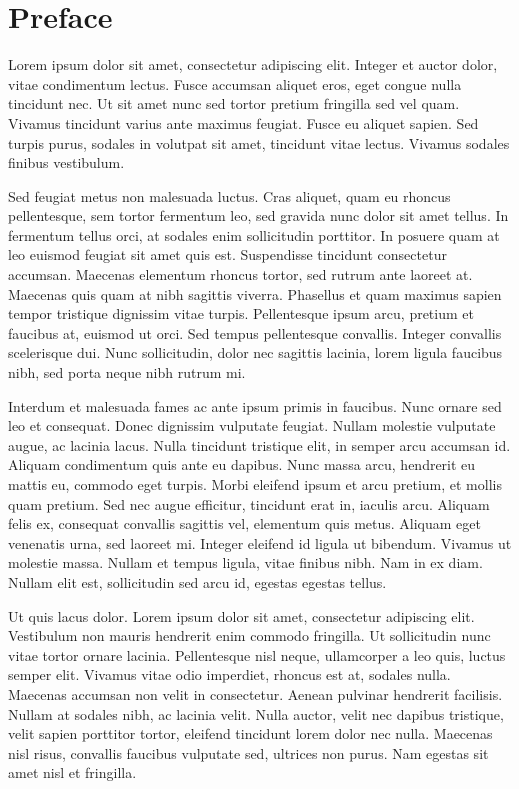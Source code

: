 \chapter*{Preface}

Lorem ipsum dolor sit amet, consectetur adipiscing elit. Integer et auctor dolor, vitae condimentum lectus. Fusce accumsan aliquet eros, eget congue nulla tincidunt nec. Ut sit amet nunc sed tortor pretium fringilla sed vel quam. Vivamus tincidunt varius ante maximus feugiat. Fusce eu aliquet sapien. Sed turpis purus, sodales in volutpat sit amet, tincidunt vitae lectus. Vivamus sodales finibus vestibulum.

Sed feugiat metus non malesuada luctus. Cras aliquet, quam eu rhoncus pellentesque, sem tortor fermentum leo, sed gravida nunc dolor sit amet tellus. In fermentum tellus orci, at sodales enim sollicitudin porttitor. In posuere quam at leo euismod feugiat sit amet quis est. Suspendisse tincidunt consectetur accumsan. Maecenas elementum rhoncus tortor, sed rutrum ante laoreet at. Maecenas quis quam at nibh sagittis viverra. Phasellus et quam maximus sapien tempor tristique dignissim vitae turpis. Pellentesque ipsum arcu, pretium et faucibus at, euismod ut orci. Sed tempus pellentesque convallis. Integer convallis scelerisque dui. Nunc sollicitudin, dolor nec sagittis lacinia, lorem ligula faucibus nibh, sed porta neque nibh rutrum mi.

Interdum et malesuada fames ac ante ipsum primis in faucibus. Nunc ornare sed leo et consequat. Donec dignissim vulputate feugiat. Nullam molestie vulputate augue, ac lacinia lacus. Nulla tincidunt tristique elit, in semper arcu accumsan id. Aliquam condimentum quis ante eu dapibus. Nunc massa arcu, hendrerit eu mattis eu, commodo eget turpis. Morbi eleifend ipsum et arcu pretium, et mollis quam pretium. Sed nec augue efficitur, tincidunt erat in, iaculis arcu. Aliquam felis ex, consequat convallis sagittis vel, elementum quis metus. Aliquam eget venenatis urna, sed laoreet mi. Integer eleifend id ligula ut bibendum. Vivamus ut molestie massa. Nullam et tempus ligula, vitae finibus nibh. Nam in ex diam. Nullam elit est, sollicitudin sed arcu id, egestas egestas tellus.

Ut quis lacus dolor. Lorem ipsum dolor sit amet, consectetur adipiscing elit. Vestibulum non mauris hendrerit enim commodo fringilla. Ut sollicitudin nunc vitae tortor ornare lacinia. Pellentesque nisl neque, ullamcorper a leo quis, luctus semper elit. Vivamus vitae odio imperdiet, rhoncus est at, sodales nulla. Maecenas accumsan non velit in consectetur. Aenean pulvinar hendrerit facilisis. Nullam at sodales nibh, ac lacinia velit. Nulla auctor, velit nec dapibus tristique, velit sapien porttitor tortor, eleifend tincidunt lorem dolor nec nulla. Maecenas nisl risus, convallis faucibus vulputate sed, ultrices non purus. Nam egestas sit amet nisl et fringilla.

 
